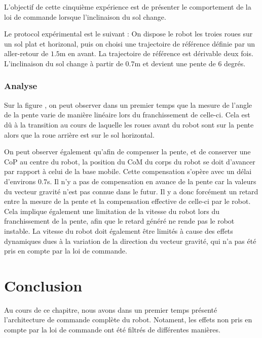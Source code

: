 	    L'objectif de cette cinquième expérience  est de présenter le comportement de la loi de commande lorsque l'inclinaison du sol change.
	    
	      Le protocol expérimental est le suivant :
	      On dispose le robot les troies roues sur un sol plat et horizonal, puis on choisi une trajectoire de référence définie par un aller-retour de $1.5$m en avant.
	      La trajectoire de référence est dérivable deux fois.
	      L'inclinaison du sol change à partir de $0.7$m et devient une pente de $6$ degrés.
	      
	   \subsubsection{Analyse}
	   
	    Sur la figure , on peut observer dans un premier temps que la mesure de l'angle de la pente varie de manière linéaire lors du franchissement de celle-ci. 
	    Cela est dû à la transition au cours de laquelle les roues avant du robot sont sur la pente alors que la roue arrière est sur le sol horizontal.
	    
	    On peut observer également qu'afin de compenser la pente, et de conserver une CoP au centre du robot, la position du CoM du corps du robot se doit d'avancer par rapport à celui de la base mobile.
	    Cette compensation s'opère avec un délai d'environs $0.7$s. Il n'y a pas de compensation en avance de la pente car la valeurs du vecteur gravité n'est pas connue dans le futur.
	    Il y a donc forcément un retard entre la mesure de la pente et la compensation effective de celle-ci par le robot.
	    Cela implique également une limitation de la vitesse du robot lors du franchissement de la pente, afin que le retard généré ne rende pas le robot instable.
	    La vitesse du robot doit également être limités à cause des effets dynamiques dues à la variation de la direction du vecteur gravité, qui n'a pas été pris en compte par la loi de commande.
	    
    \section{Conclusion}  

      Au cours de ce chapitre, nous avons dans un premier temps présenté l'architecture de commande complète du robot. 
      Notament, les effets non pris en compte par la loi de commande ont été filtrés de différentes manières.
     
